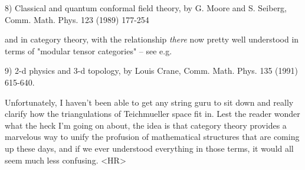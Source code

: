 8) Classical and quantum conformal field theory, by G. Moore and S.
Seiberg, Comm. Math. Phys. 123 (1989) 177-254

and in category theory, with the relationship \emph{there} now pretty well
understood in terms of "modular tensor categories"  -- see e.g. 

9) 2-d physics and 3-d topology, by Louis Crane, Comm. Math. Phys. 135
(1991) 615-640.  

Unfortunately, I haven't been able to get any string guru to sit down 
and really clarify how the triangulations of Teichmueller space fit in.
Lest the reader wonder what the heck I'm going on about, the idea is
that category theory provides a marvelous way to unify the profusion of
mathematical structures that are coming up these days, and if we ever
understood everything in those terms, it would all seem much less
confusing.  
<HR>




